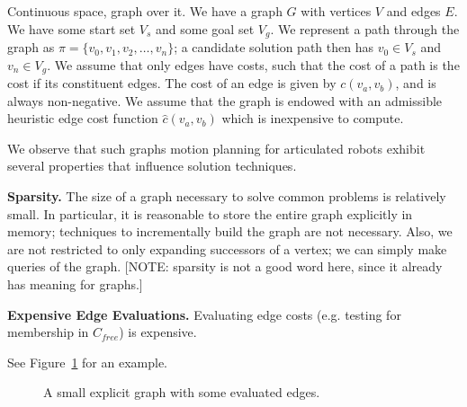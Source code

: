 \documentclass{report}
\begin{document}
Continuous space, graph over it.
We have a graph $G$ with vertices $V$ and edges $E$.
We have some start set $V_s$ and some goal set $V_g$.
We represent a path through the graph as
$\pi = \{ v_0, v_1, v_2, \dots, v_n \}$;
a candidate solution path then has $v_0 \in V_s$ and $v_n \in V_g$.
We assume that only edges have costs,
such that the cost of a path is the cost if its constituent edges.
The cost of an edge is given by $c(v_a,v_b)$, and is always non-negative.
We assume that the graph is endowed with an admissible heuristic edge cost
function
$\hat{c}(v_a,v_b)$
which is inexpensive to compute.

We observe that such graphs motion planning for articulated robots
exhibit several properties that influence solution techniques.

\textbf{Sparsity.}
The size of a graph necessary to solve common problems
is relatively small.
In particular, it is reasonable to store the entire graph explicitly in
memory;
techniques to incrementally build the graph
are not necessary.
Also,
we are not restricted to only expanding successors of a vertex;
we can simply make queries of the graph.
[NOTE: sparsity is not a good word here, since it already has meaning
for graphs.]

\textbf{Expensive Edge Evaluations.}
Evaluating edge costs (e.g. testing for membership in $C_{free}$)
is expensive.

See Figure~\ref{fig:seg-intro} for an example.

\begin{figure}
\centering
{}
\caption{A small explicit graph with some evaluated edges.}
\label{fig:seg-intro}
\end{figure}
\end{document}
